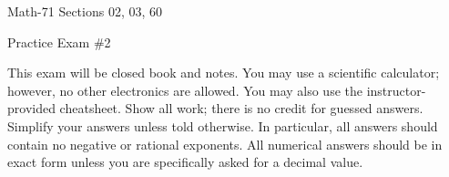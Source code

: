 \documentclass[letterpaper,12pt,fleqn]{article}
\begin{document}
\begin{center}
  \large
  Math-71 Sections 02, 03, 60

  \Large
  Practice Exam \#2
\end{center}

\vspace{0.25in}

This exam will be closed book and notes. You may use a scientific calculator; however, no other electronics are
allowed.  You may also use the instructor-provided cheatsheet.  Show all work; there is no credit for guessed
answers.  Simplify your answers unless told otherwise.  In particular, all answers should contain no negative or
rational exponents.  All numerical answers should be in exact form unless you are specifically asked for a decimal
value.

\vspace{0.25in}
\end{document}
